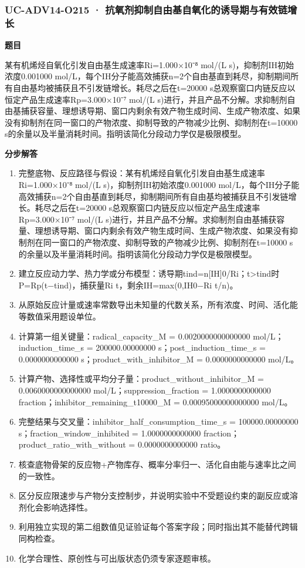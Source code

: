 \documentclass[UTF8,11pt,a4paper]{ctexart}
\begin{document}
\subsubsection*{UC-ADV14-O215 · 抗氧剂抑制自由基自氧化的诱导期与有效链增长}
\noindent\textbf{题目}\par
某有机烯烃自氧化引发自由基生成速率Ri=1.000×10⁻⁸ mol/(L s)，抑制剂IH初始浓度0.001000 mol/L，每个IH分子能高效捕获n=2个自由基直到耗尽，抑制期间所有自由基均被捕获且不引发链增长。耗尽之后在t=20000 s总观察窗口内链反应以恒定产品生成速率Rp=3.000×10⁻⁷ mol/(L s)进行，并且产品不分解。求抑制剂自由基捕获容量、理想诱导期、窗口内剩余有效产物生成时间、生成产物浓度、如果没有抑制剂在同一窗口的产物浓度、抑制导致的产物减少比例、抑制剂在t=10000 s的余量以及半量消耗时间。指明该简化分段动力学仅是极限模型。\par
\medskip\noindent\textbf{分步解答}
\begin{enumerate}
\item 完整底物、反应路径与假设：某有机烯烃自氧化引发自由基生成速率Ri=1.000×10⁻⁸ mol/(L s)，抑制剂IH初始浓度0.001000 mol/L，每个IH分子能高效捕获n=2个自由基直到耗尽，抑制期间所有自由基均被捕获且不引发链增长。耗尽之后在t=20000 s总观察窗口内链反应以恒定产品生成速率Rp=3.000×10⁻⁷ mol/(L s)进行，并且产品不分解。求抑制剂自由基捕获容量、理想诱导期、窗口内剩余有效产物生成时间、生成产物浓度、如果没有抑制剂在同一窗口的产物浓度、抑制导致的产物减少比例、抑制剂在t=10000 s的余量以及半量消耗时间。指明该简化分段动力学仅是极限模型。
\item 建立反应动力学、热力学或分布模型：诱导期tind=n[IH]0/Ri；t>tind时P=Rp(t−tind)，捕获量Ri t，剩余IH=max(0,IH0−Ri t/n)。
\item 从原始反应计量或速率常数导出未知量的代数关系，所有浓度、时间、活化能等数值采用题设单位。
\item 计算第一组关键量：radical\_capacity\_M = 0.0020000000000000 mol/L；induction\_time\_s = 200000.00000000 s；post\_induction\_time\_s = 0.0000000000000 s；product\_with\_inhibitor\_M = 0.0000000000000 mol/L。
\item 计算产物、选择性或平均分子量：product\_without\_inhibitor\_M = 0.0060000000000000 mol/L；suppression\_fraction = 1.0000000000000 fraction；inhibitor\_remaining\_t10000\_M = 0.00095000000000000 mol/L。
\item 完整结果与交叉量：inhibitor\_half\_consumption\_time\_s = 100000.00000000 s；fraction\_window\_inhibited = 1.0000000000000 fraction；product\_ratio\_with\_without = 0.0000000000000 ratio。
\item 核查底物骨架的反应物+产物库存、概率分率归一、活化自由能与速率比之间的一致性。
\item 区分反应限速步与产物分支控制步，并说明实验中不受题设约束的副反应或溶剂化会影响选择性。
\item 利用独立实现的第二组数值见证验证每个答案字段；同时指出其不能替代跨辑同构检查。
\item 化学合理性、原创性与可出版状态仍须专家逐题审核。
\end{enumerate}
\end{document}
